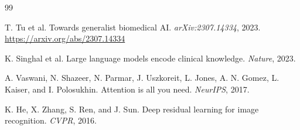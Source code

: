 \begin{thebibliography}{99}

T. Tu et al.
Towards generalist biomedical AI.
\textit{arXiv:2307.14334}, 2023.
\url{https://arxiv.org/abs/2307.14334}

K. Singhal et al.
Large language models encode clinical knowledge.
\textit{Nature}, 2023.

A. Vaswani, N. Shazeer, N. Parmar, J. Uszkoreit, L. Jones, A. N. Gomez,
L. Kaiser, and I. Polosukhin.
Attention is all you need.
\textit{NeurIPS}, 2017.

K. He, X. Zhang, S. Ren, and J. Sun.
Deep residual learning for image recognition.
\textit{CVPR}, 2016.

\end{thebibliography}
